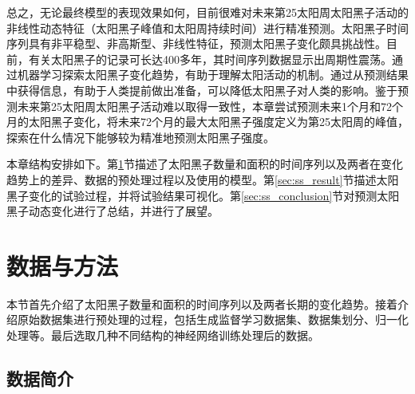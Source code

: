 总之，无论最终模型的表现效果如何，目前很难对未来第25太阳周太阳黑子活动的非线性动态特征（太阳黑子峰值和太阳周持续时间）进行精准预测。太阳黑子时间序列具有非平稳型、非高斯型、非线性特征，预测太阳黑子变化颇具挑战性。目前，有关太阳黑子的记录可长达400多年，其时间序列数据显示出周期性震荡。通过机器学习探索太阳黑子变化趋势，有助于理解太阳活动的机制。通过从预测结果中获得信息，有助于人类提前做出准备，可以降低太阳黑子对人类的影响。鉴于预测未来第25太阳周太阳黑子活动难以取得一致性，本章尝试预测未来1个月和72个月的太阳黑子变化，将未来72个月的最大太阳黑子强度定义为第25太阳周的峰值，探索在什么情况下能够较为精准地预测太阳黑子强度。

本章结构安排如下。第\ref{sec:ss_data_method}节描述了太阳黑子数量和面积的时间序列以及两者在变化趋势上的差异、数据的预处理过程以及使用的模型。第\ref{sec:ss_result}节描述太阳黑子变化的试验过程，并将试验结果可视化。第\ref{sec:ss_conclusion}节对预测太阳黑子动态变化进行了总结，并进行了展望。

\section{数据与方法}\label{sec:ss_data_method}

本节首先介绍了太阳黑子数量和面积的时间序列以及两者长期的变化趋势。接着介绍原始数据集进行预处理的过程，包括生成监督学习数据集、数据集划分、归一化处理等。最后选取几种不同结构的神经网络训练处理后的数据。

\subsection{数据简介}\label{sec:ss_dataset}

